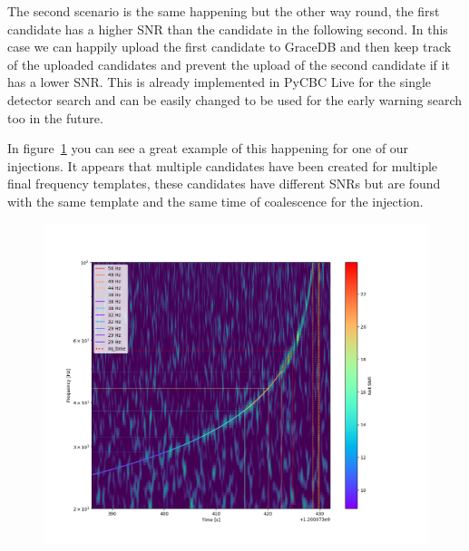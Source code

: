 The second scenario is the same happening but the other way round, the first candidate has a higher SNR than the candidate in the following second. In this case we can happily upload the first candidate to GraceDB and then keep track of the uploaded candidates and prevent the upload of the second candidate if it has a lower SNR. This is already implemented in PyCBC Live for the single detector search and can be easily changed to be used for the early warning search too in the future.

In figure~\ref{fig:ew_boundary_candidates} you can see a great example of this happening for one of our injections. It appears that multiple candidates have been created for multiple final frequency templates, these candidates have different SNRs but are found with the same template and the same time of coalescence for the injection.
%
\begin{figure}
       \centering
    \includegraphics[width=\textwidth]{images/ew/multi_freq.png}
    \caption{}
    \label{fig:ew_boundary_candidates}
\end{figure}
%
